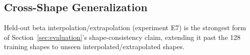 \subsection{Cross-Shape Generalization}
\label{sec:exp:cross-shape}

Held-out beta interpolation/extrapolation (experiment E7) is the strongest form of
Section~\ref{sec:evaluation}'s shape-consistency claim, extending it past the 128 training shapes
to unseen interpolated/extrapolated shapes. 
